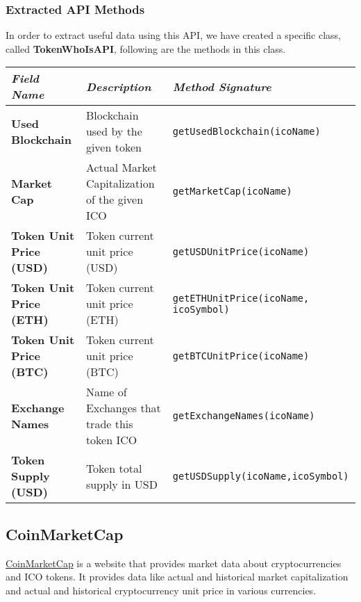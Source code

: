 \subsubsection{Extracted API Methods}
In order to extract useful data using this API, we have created a specific class, called \textbf{TokenWhoIsAPI}, following are the methods in this class.
\begin{center}
\begin{tabular}{| C{2cm} | C{4cm} | C{7cm} |} \hline
    \textit{Field Name} & \textit{Description} & \textit{Method Signature}\\ \hline 
    \textbf{Used Blockchain} & Blockchain used by the given token & \texttt{getUsedBlockchain(icoName)}\\ \hline 
    \textbf{Market Cap} & Actual Market Capitalization of the given ICO &
    \texttt{getMarketCap(icoName)}\\ \hline
    \textbf{Token Unit Price (USD)} & Token current unit price (USD) &
    \texttt{getUSDUnitPrice(icoName)
    }\\ \hline
    \textbf{Token Unit Price (ETH)} & Token current unit price (ETH) &
    \texttt{getETHUnitPrice(icoName, icoSymbol)}\\ \hline 
    \textbf{Token Unit Price (BTC)} & Token current unit price (BTC) &
    \texttt{getBTCUnitPrice(icoName)}\\ \hline 
    \textbf{Exchange Names} & Name of Exchanges that trade this token ICO &
    \texttt{getExchangeNames(icoName)}\\ \hline 
    \textbf{Token Supply (USD)} & Token total supply in USD &
    \texttt{getUSDSupply(icoName,icoSymbol)}\\ \hline
\end{tabular}
\end{center}

\subsection{CoinMarketCap}
\href{https://coinmarketcap.com/}{CoinMarketCap} is a website that provides market data about cryptocurrencies and ICO tokens. It provides data like actual and historical market capitalization and actual and historical cryptocurrency unit price in various currencies.
